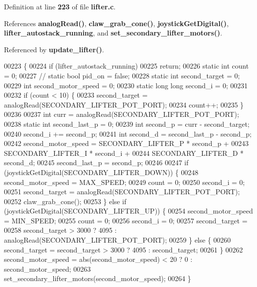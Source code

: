 Definition at line \textbf{ 223} of file \textbf{ lifter.\+c}.



References \textbf{ analog\+Read()}, \textbf{ claw\+\_\+grab\+\_\+cone()}, \textbf{ joystick\+Get\+Digital()}, \textbf{ lifter\+\_\+autostack\+\_\+running}, and \textbf{ set\+\_\+secondary\+\_\+lifter\+\_\+motors()}.



Referenced by \textbf{ update\+\_\+lifter()}.


\begin{DoxyCode}
00223                                       \{
00224   \textcolor{keywordflow}{if} (lifter_autostack_running)
00225     \textcolor{keywordflow}{return};
00226   \textcolor{keyword}{static} \textcolor{keywordtype}{int} count = 0;
00227   \textcolor{comment}{// static bool pid\_on = false;}
00228   \textcolor{keyword}{static} \textcolor{keywordtype}{int} second\_target = 0;
00229   \textcolor{keywordtype}{int} second\_motor\_speed = 0;
00230   \textcolor{keyword}{static} \textcolor{keywordtype}{long} \textcolor{keywordtype}{long} second\_i = 0;
00231 
00232   \textcolor{keywordflow}{if} (count < 10) \{
00233     second\_target = analogRead(SECONDARY\_LIFTER\_POT\_PORT);
00234     count++;
00235   \}
00236 
00237   \textcolor{keywordtype}{int} curr = analogRead(SECONDARY\_LIFTER\_POT\_PORT);
00238   \textcolor{keyword}{static} \textcolor{keywordtype}{int} second\_last\_p = 0;
00239   \textcolor{keywordtype}{int} second\_p = curr - second\_target;
00240   second\_i += second\_p;
00241   \textcolor{keywordtype}{int} second\_d = second\_last\_p - second\_p;
00242   second\_motor\_speed = SECONDARY\_LIFTER\_P * second\_p +
00243                        SECONDARY\_LIFTER\_I * second\_i +
00244                        SECONDARY\_LIFTER\_D * second\_d;
00245   second\_last\_p = second\_p;
00246 
00247   \textcolor{keywordflow}{if} (joystickGetDigital(SECONDARY\_LIFTER\_DOWN)) \{
00248     second\_motor\_speed = MAX\_SPEED;
00249     count = 0;
00250     second\_i = 0;
00251     second\_target = analogRead(SECONDARY\_LIFTER\_POT\_PORT);
00252     claw_grab_cone();
00253   \} \textcolor{keywordflow}{else} \textcolor{keywordflow}{if} (joystickGetDigital(SECONDARY\_LIFTER\_UP)) \{
00254     second\_motor\_speed = MIN\_SPEED;
00255     count = 0;
00256     second\_i = 0;
00257     second\_target =
00258         second\_target > 3000 ? 4095 : analogRead(SECONDARY\_LIFTER\_POT\_PORT);
00259   \} \textcolor{keywordflow}{else} \{
00260     second\_target = second\_target > 3000 ? 4095 : second\_target;
00261   \}
00262   second\_motor\_speed = abs(second\_motor\_speed) < 20 ? 0 : second\_motor\_speed;
00263   set_secondary_lifter_motors(second\_motor\_speed);
00264 \}
\end{DoxyCode}
